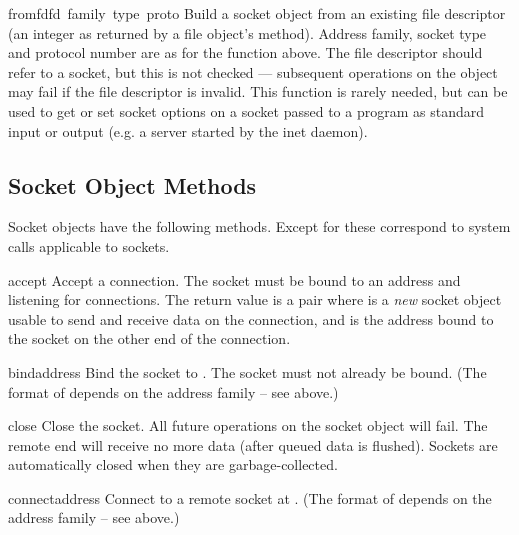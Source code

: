 \begin{funcdesc}{fromfd}{fd\, family\, type\, proto}
Build a socket object from an existing file descriptor (an integer as
returned by a file object's  method).  Address family,
socket type and protocol number are as for the  function
above.  The file descriptor should refer to a socket, but this is not
checked --- subsequent operations on the object may fail if the file
descriptor is invalid.  This function is rarely needed, but can be
used to get or set socket options on a socket passed to a program as
standard input or output (e.g. a server started by the \UNIX{} inet
daemon).
\end{funcdesc}

\subsection{Socket Object Methods}

\noindent
Socket objects have the following methods.  Except for
 these correspond to \UNIX{} system calls applicable to
sockets.

\renewcommand{\indexsubitem}{(socket method)}
\begin{funcdesc}{accept}{}
Accept a connection.
The socket must be bound to an address and listening for connections.
The return value is a pair 
where  is a \emph{new} socket object usable to send and
receive data on the connection, and  is the address bound
to the socket on the other end of the connection.
\end{funcdesc}

\begin{funcdesc}{bind}{address}
Bind the socket to .  The socket must not already be bound.
(The format of  depends on the address family -- see above.)
\end{funcdesc}

\begin{funcdesc}{close}{}
Close the socket.  All future operations on the socket object will fail.
The remote end will receive no more data (after queued data is flushed).
Sockets are automatically closed when they are garbage-collected.
\end{funcdesc}

\begin{funcdesc}{connect}{address}
Connect to a remote socket at .
(The format of  depends on the address family -- see above.)
\end{funcdesc}

